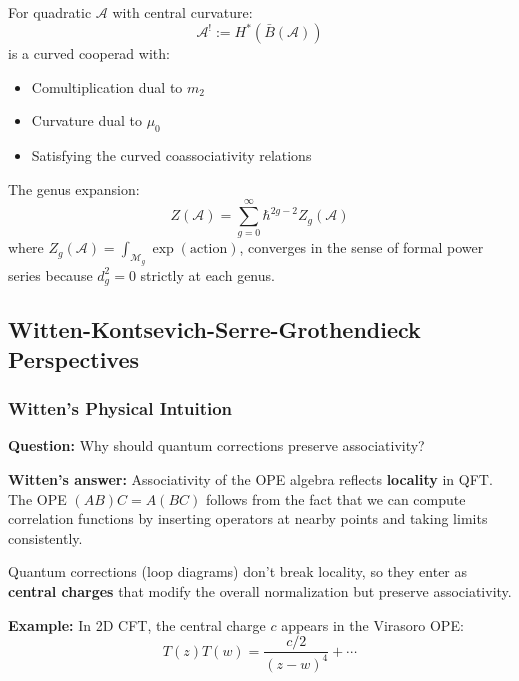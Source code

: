 \begin{corollary}\label{cor:koszul-dual-cooperad}
For quadratic $\mathcal{A}$ with central curvature:
\begin{equation}
\mathcal{A}^! := H^*(\bar{B}(\mathcal{A}))
\end{equation}
is a curved cooperad with:
\begin{itemize}
\item Comultiplication dual to $m_2$
\item Curvature dual to $\mu_0$
\item Satisfying the curved coassociativity relations
\end{itemize}
\end{corollary}

\begin{corollary}\label{cor:genus-expansion-converges}
The genus expansion:
\begin{equation}
Z(\mathcal{A}) = \sum_{g=0}^\infty \hbar^{2g-2} Z_g(\mathcal{A})
\end{equation}
where $Z_g(\mathcal{A}) = \int_{\mathcal{M}_g} \exp(\text{action})$, converges in the sense of 
formal power series because $d_g^2 = 0$ strictly at each genus.
\end{corollary}

\subsection{Witten-Kontsevich-Serre-Grothendieck Perspectives}

\subsubsection{Witten's Physical Intuition}

\textbf{Question:} Why should quantum corrections preserve associativity?

\textbf{Witten's answer:} Associativity of the OPE algebra reflects \textbf{locality} in QFT. 
The OPE $(AB)C = A(BC)$ follows from the fact that we can compute correlation functions by 
inserting operators at nearby points and taking limits consistently.

Quantum corrections (loop diagrams) don't break locality, so they enter as \textbf{central charges} 
that modify the overall normalization but preserve associativity.

\textbf{Example:} In 2D CFT, the central charge $c$ appears in the Virasoro OPE:
$$T(z)T(w) = \frac{c/2}{(z-w)^4} + \cdots$$

